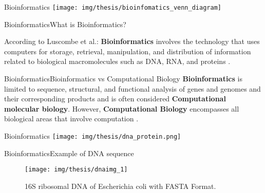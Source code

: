 \documentclass[10pt]{beamer}
\newcommand{\1}{
        	\setbeamertemplate{background}{
        		\texttt{[image: img/1]}
        		\tikz[overlay] \fill[fill opacity=0.75,fill=white] (0,0) rectangle (-\paperwidth,\paperheight);
        	}
}
\begin{document}
\begin{frame}{Bioinformatics}{}
	\centering
	\texttt{[image: img/thesis/bioinfomatics\_venn\_diagram]}
\end{frame}

\begin{frame}{Bioinformatics}{What is Bioinformatics?}

	
	According to Luscombe et al.: \textbf{Bioinformatics} involves the technology that uses computers for storage, retrieval, manipulation, and distribution of information related to biological macromolecules such as DNA, RNA, and proteins \cite{luscombe2001bioinformatics}.
	
\end{frame}

\begin{frame}{Bioinformatics}{Bioinformatics vs Computational Biology}
	\textbf{Bioinformatics} is limited to sequence, structural, and functional analysis of genes and genomes and their corresponding products and is often considered \textbf{Computational
		molecular biology}. However, \textbf{Computational Biology} encompasses all biological areas that involve computation \cite{xiong2006essential}.
\end{frame}

\begin{frame}{Bioinformatics}{}
	\centering
	\texttt{[image: img/thesis/dna\_protein.png]}
\end{frame}

\begin{frame}{Bioinformatics}{Example of DNA sequence}
	\begin{figure}[]
		\centering
		\texttt{[image: img/thesis/dnaimg\_1]}
		\label{img:mot2}
		\caption{16S ribosomal DNA of Escherichia coli with FASTA Format.}
	\end{figure}
\end{frame}
\end{document}
